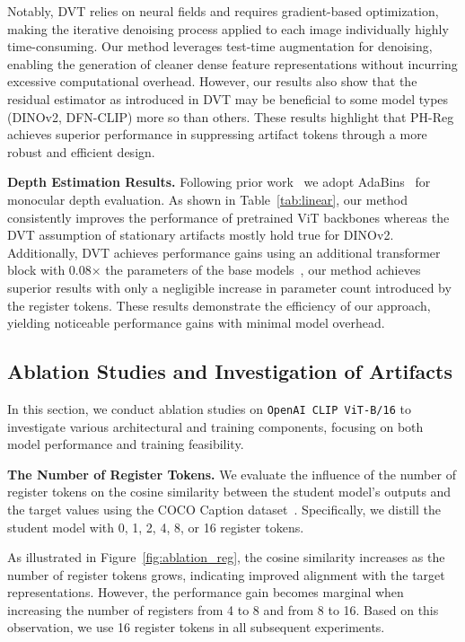 Notably, DVT relies on neural fields and requires gradient-based optimization, making the iterative denoising process applied to each image individually highly time-consuming. Our method leverages test-time augmentation for denoising, enabling the generation of cleaner dense feature representations without incurring excessive computational overhead. However, our results also show that the residual estimator as introduced in DVT may be beneficial to some model types (DINOv2, DFN-CLIP) more so than others. These results highlight that PH-Reg achieves superior performance in suppressing artifact tokens through a more robust and efficient design.

\textbf{Depth Estimation Results.}  Following prior work~\citep{oquab2023dinov2,yang2024denoising} we adopt AdaBins~\citep{Bhat2021adabins} for monocular depth evaluation. 
As shown in Table~\ref{tab:linear}, our method consistently improves the performance of pretrained ViT backbones whereas the DVT assumption of stationary artifacts mostly hold true for DINOv2. Additionally, DVT achieves performance gains using an additional transformer block with 0.08× the parameters of the base models~\citep{yang2024denoising}, our method achieves superior results with only a negligible increase in parameter count introduced by the register tokens.
These results demonstrate the efficiency of our approach, yielding noticeable performance gains with minimal model overhead.

\subsection{Ablation Studies and Investigation of Artifacts}
\label{section_ablation}
\vspace{-.2cm}
In this section, we conduct ablation studies on \texttt{OpenAI CLIP ViT-B/16} to investigate  various architectural and training components, focusing on both model performance and training feasibility.



\textbf{The Number of Register Tokens.} We evaluate the influence of the number of register tokens on the cosine similarity between the student model’s outputs and the target values using the COCO Caption dataset~\citep{chen2015microsoft}. Specifically, we distill the student model with 0, 1, 2, 4, 8, or 16 register tokens.

As illustrated in Figure~\ref{fig:ablation_reg}, the cosine similarity increases as the number of register tokens grows, indicating improved alignment with the target representations. However, the performance gain becomes marginal when increasing the number of registers from 4 to 8 and from 8 to 16. Based on this observation, we use 16 register tokens in all subsequent experiments.

